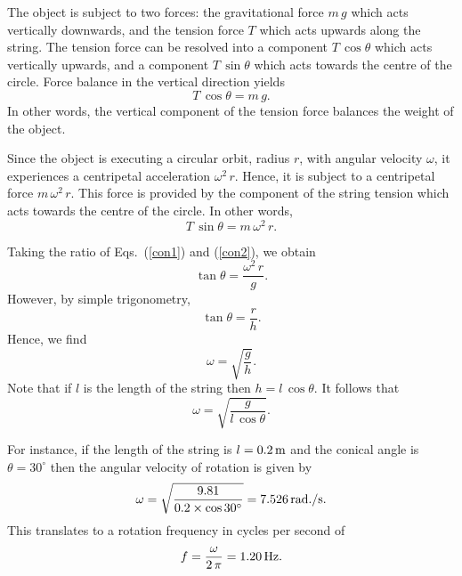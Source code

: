 The object is subject to two forces: the gravitational force $m\,g$ which acts vertically
downwards, and the tension force $T$ which acts upwards along the string. The tension
force can be resolved into a component $T\,\cos\theta$ which acts vertically upwards, and
a component $T\,\sin\theta$ which acts towards the centre of the circle. Force balance
in the vertical direction yields
\begin{equation}\label{con1}
T\,\cos\theta = m\,g.
\end{equation}
In other words, the vertical component of the tension force balances the weight of the object.

Since the object is executing a circular orbit, radius $r$, with angular velocity $\omega$,
it experiences a centripetal acceleration $\omega^2\,r$. Hence, it is subject to
a centripetal force $m\,\omega^2\,r$. This force is provided by the component of
the string tension which acts towards the centre of the circle. In other words,
\begin{equation}\label{con2}
T\,\sin\theta = m\,\omega^2\,r.
\end{equation}

Taking the ratio of Eqs.~(\ref{con1}) and (\ref{con2}), we obtain
\begin{equation}
\tan\theta = \frac{\omega^2\,r}{g}.
\end{equation}
However, by simple trigonometry,
\begin{equation}
\tan\theta = \frac{r}{h}.
\end{equation}
Hence, we find
\begin{equation}
\omega = \sqrt{\frac{g}{h}}.
\end{equation}
Note that if $l$ is the length of the string then $h=l\,\cos\theta$. It follows that
\begin{equation}
\omega = \sqrt{\frac{g}{l\,\cos\theta}}.
\end{equation}

For instance, if the length of the string is $l=0.2\,{\rm m}$ and the conical angle is $\theta=30^\circ$
then the angular velocity of rotation is given by
\begin{equation}
\omega = \sqrt{\frac{9.81}{0.2\times \cos 30^\circ}} = 7.526\,{\rm rad./s}.
\end{equation}
This translates to a rotation frequency in cycles per second of
\begin{equation}
f = \frac{\omega}{2\,\pi} = 1.20\,{\rm Hz}.
\end{equation}


